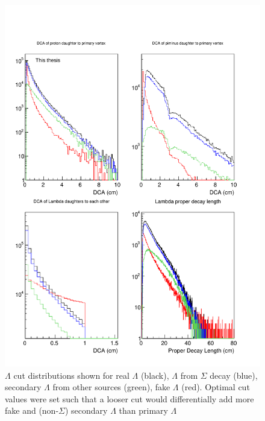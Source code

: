 \begin{figure}
\includegraphics[width=36pc]{Figures/2014-03-31-Distribution-Lambda-4Types-DCA-DCA-DCA-DecayLength.pdf}
\caption[$\Lambda$ cut distributions]{$\Lambda$ cut distributions shown for real $\Lambda$ (black), $\Lambda$ from $\Sigma$ decay (blue), secondary $\Lambda$ from other sources (green), fake $\Lambda$ (red). Optimal cut values were set such that a looser cut would differentially add more fake and (non-$\Sigma$) secondary $\Lambda$ than primary $\Lambda$}
\label{fig:LambdaCutDists2}
\end{figure}

